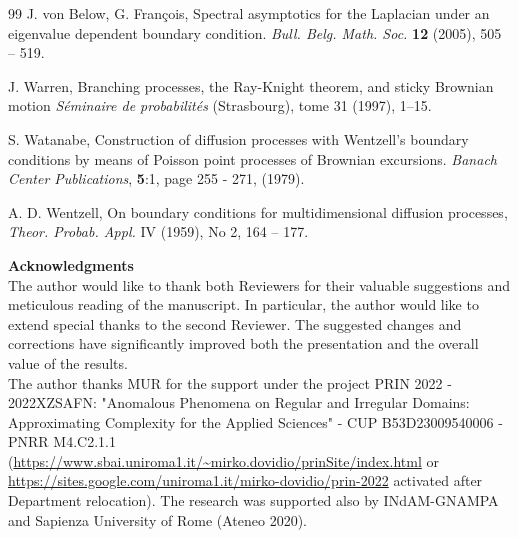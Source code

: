 \documentclass[11pt,a4paper]{article}
\newcommand{\magenta}{black}
\begin{document}
\begin{thebibliography}{99}
J. von Below, G. Fran\c{c}ois,
Spectral asymptotics for the Laplacian under an eigenvalue dependent boundary condition.
\textit{Bull. Belg. Math. Soc.} {\bf 12} (2005), 505 -- 519.

J. Warren,
Branching processes, the Ray-Knight theorem, and sticky Brownian motion
\textit{S\'{e}minaire de probabilit\'{e}s} (Strasbourg), tome 31 (1997), 1--15.


{\color{\magenta}
S. Watanabe, Construction of diffusion processes with Wentzell's boundary conditions by means of Poisson point processes of Brownian excursions.
\textit{Banach Center Publications}, {\bf 5}:1, page 255 - 271, (1979).
}

A. D. Wentzell, 
On boundary conditions for multidimensional diffusion processes, 
\textit{Theor. Probab. Appl.} IV (1959), No 2, 164 -- 177.

\end{thebibliography}


{\bf Acknowledgments}\\
The author would like to thank both Reviewers for their valuable suggestions and meticulous reading of the manuscript. In particular, the author would like to extend special thanks to the second Reviewer. The suggested changes and corrections have significantly improved both the presentation and the overall value of the results.\\
The author thanks MUR for the support under the project PRIN 2022 - 2022XZSAFN: "Anomalous Phenomena on Regular and Irregular Domains: Approximating Complexity for the Applied Sciences" - CUP B53D23009540006 - PNRR M4.C2.1.1 (\url{https://www.sbai.uniroma1.it/~mirko.dovidio/prinSite/index.html} {\color{\magenta} or \url{https://sites.google.com/uniroma1.it/mirko-dovidio/prin-2022} activated after Department relocation}). The research was supported also by INdAM-GNAMPA and Sapienza University of Rome (Ateneo 2020). 
\end{document}

